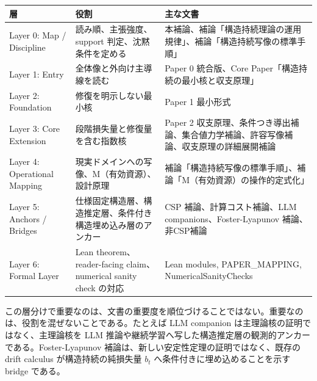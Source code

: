 \documentclass[12pt,a4paper]{article}
\begin{document}
{\def\LTcaptype{table} %
\begin{longtable}[]{@{}
  >{\raggedright\arraybackslash}p{}
  >{\raggedright\arraybackslash}p{}
  >{\raggedright\arraybackslash}p{}@{}}
\toprule\noalign{}
\begin{minipage}[b]{\linewidth}\raggedright
層
\end{minipage} & \begin{minipage}[b]{\linewidth}\raggedright
役割
\end{minipage} & \begin{minipage}[b]{\linewidth}\raggedright
主な文書
\end{minipage} \\
\midrule\noalign{}
\endhead
\bottomrule\noalign{}
\endlastfoot
Layer 0: Map / Discipline & 読み順、主張強度、support 判定、沈黙条件を定める & 本補論、補論「構造持続理論の運用規律」、補論「構造持続写像の標準手順」 \\
Layer 1: Entry & 全体像と外向け主導線を読む & Paper 0 統合版、Core Paper「構造持続の最小核と収支原理」 \\
Layer 2: Foundation & 修復を明示しない最小核 & Paper 1 最小形式 \\
Layer 3: Core Extension & 段階損失量と修復量を含む指数核 & Paper 2 収支原理、条件つき導出補論、集合値力学補論、許容写像補論、収支原理の詳細展開補論 \\
Layer 4: Operational Mapping & 現実ドメインへの写像、M（有効資源）、設計原理 & 補論「構造持続写像の標準手順」、補論「M（有効資源）の操作的定式化」 \\
Layer 5: Anchors / Bridges & 仕様固定構造層、構造推定層、条件付き構造埋め込み層のアンカー & CSP 補論、計算コスト補論、LLM companions、Foster-Lyapunov 補論、非CSP補論 \\
Layer 6: Formal Layer & Lean theorem、reader-facing claim、numerical sanity check の対応 & Lean modules, PAPER\_MAPPING, NumericalSanityChecks \\
\end{longtable}
}

この層分けで重要なのは、文書の重要度を順位づけることではない。重要なのは、役割を混ぜないことである。たとえば LLM companion は主理論核の証明ではなく、主理論核を LLM 推論や継続学習へ写した構造推定層の観測的アンカーである。Foster-Lyapunov 補論は、新しい安定性定理の証明ではなく、既存の drift calculus が構造持続の純損失量 \(b_{t}\) へ条件付きに埋め込めることを示す bridge である。
\end{document}
